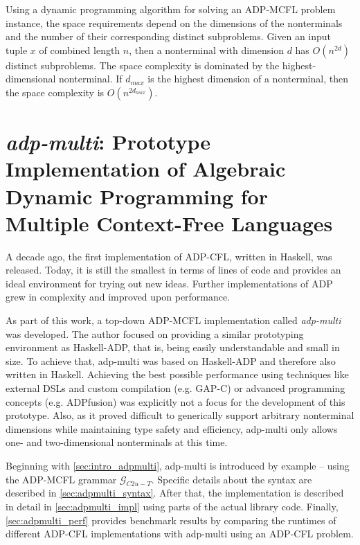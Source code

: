 \documentclass[
    a4paper,
    12pt,
    twoside,
    BCOR=12mm,
    parskip=half,
    chapterprefix,
    numbers=noenddot,
    bibliography=totoc
]{scrbook}
\begin{document}
Using a dynamic programming algorithm for solving an ADP-MCFL problem instance, the space requirements depend on the dimensions of the nonterminals and the number of their corresponding distinct subproblems. Given an input tuple $x$ of combined length $n$, then a nonterminal with dimension $d$ has $O(n^{2d})$ distinct subproblems. The space complexity is dominated by the highest-dimensional nonterminal. If $d_{max}$ is the highest dimension of a nonterminal, then the space complexity is $O(n^{2d_{max}})$.


  
\chapter{\texorpdfstring{\emph{adp-multi}: Prototype Implementation of Algebraic Dynamic Programming for Multiple Context-Free Languages}{adp-multi: Prototype Implementation of ADP-MCFL}}
\label{ch:adp-multi}

A decade ago, the first implementation of ADP-CFL, written in Haskell, was released. Today, it is still the smallest in terms of lines of code and provides an ideal environment for trying out new ideas. Further implementations of ADP grew in complexity and improved upon performance.

As part of this work, a top-down ADP-MCFL implementation called \emph{adp-multi} was developed. The author focused on providing a similar prototyping environment as Haskell-ADP, that is, being easily understandable and small in size. To achieve that, adp-multi was based on Haskell-ADP and therefore also written in Haskell. Achieving the best possible performance using techniques like external \glspl{DSL} and custom compilation (e.g. GAP-C) or advanced programming concepts (e.g. ADPfusion) was explicitly not a focus for the development of this prototype. Also, as it proved difficult to generically support arbitrary nonterminal dimensions while maintaining type safety and efficiency, adp-multi only allows one- and two-dimensional nonterminals at this time.

Beginning with \cref{sec:intro_adpmulti}, adp-multi is introduced by example -- using the ADP-MCFL grammar $\mathcal{G}_{C2u-T}$. Specific details about the syntax are described in \cref{sec:adpmulti_syntax}. After that, the implementation is described in detail in \cref{sec:adpmulti_impl} using parts of the actual library code. Finally, \cref{sec:adpmulti_perf} provides benchmark results by comparing the runtimes of different ADP-CFL implementations with adp-multi using an ADP-CFL problem.
\end{document}
